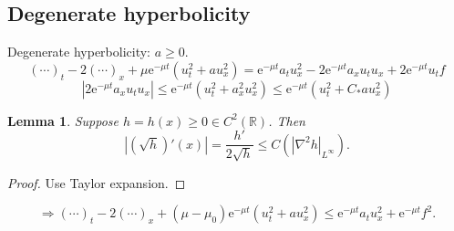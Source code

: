 \documentclass[12pt]{article}
\newtheorem{lemma}{Lemma}
\begin{document}
\subsection{Degenerate hyperbolicity}
Degenerate hyperbolicity: $a\ge 0$.
\[(\cdots)_t-2(\cdots)_x+\mu \mathrm{e}^{-\mu t} \left(u_t^2+au_x^2 \right)=\mathrm{e}^{-\mu t}a_tu_x^2-2\mathrm{e}^{-\mu t}a_xu_tu_x+2\mathrm{e}^{-\mu t}u_tf \]
\[\left|2\mathrm{e}^{-\mu t}a_xu_tu_x \right|\le \mathrm{e}^{-\mu t} \left(u_t^2+a_x^2u_x^2 \right)\le \mathrm{e}^{-\mu t} \left(u_t^2+C_*au_x^2 \right) \]
\begin{lemma}
Suppose $h=h(x)\ge0\in C^2(\mathbb{R})$. Then
\[\left|\left(\sqrt{h} \right)'(x) \right| =\frac{h'}{2\sqrt{h}}\le C\left(\left|\nabla^2h \right|_{L^\infty} \right). \]
\end{lemma}
\begin{proof}
Use Taylor expansion.
\end{proof}

\[\Rightarrow(\cdots)_t-2(\cdots)_x+(\mu-\mu_0)\mathrm{e}^{-\mu t}\left(u_t^2+au_x^2 \right)\le \mathrm{e}^{-\mu t}a_tu_x^2+\mathrm{e}^{-\mu t}f^2. \]
\end{document}
